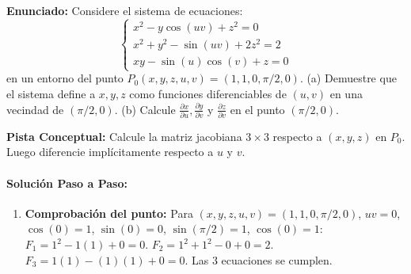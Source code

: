 \documentclass[11pt,a4paper]{article}
\begin{document}
\begin{tcolorbox}[colback=white,colframe=gray!40,arc=1mm,boxrule=0.5pt,left=3mm,right=3mm,top=2mm,bottom=2mm]
\textbf{Enunciado:} Considere el sistema de ecuaciones:
\begin{equation*}
\begin{cases} x^2 - y\cos(uv) + z^2 = 0 \\ x^2 + y^2 - \sin(uv) + 2z^2 = 2 \\ xy - \sin(u)\cos(v) + z = 0 \end{cases}
\end{equation*}
en un entorno del punto $P_0(x,y,z,u,v) = (1, 1, 0, \pi/2, 0)$.
(a) Demuestre que el sistema define a $x,y,z$ como funciones diferenciables de $(u,v)$ en una vecindad de $(\pi/2, 0)$.
(b) Calcule $\frac{\partial x}{\partial u}, \frac{\partial y}{\partial v}$ y $\frac{\partial z}{\partial v}$ en el punto $(\pi/2, 0)$.
\end{tcolorbox}

\begin{tcolorbox}[colback=yellow!4,colframe=accentamber!70,arc=1mm,boxrule=0.5pt,left=3mm,right=3mm,top=1.5mm,bottom=1.5mm]
\textbf{Pista Conceptual:} Calcule la matriz jacobiana $3\times 3$ respecto a $(x,y,z)$ en $P_0$. Luego diferencie implícitamente respecto a $u$ y $v$.
\end{tcolorbox}

\paragraph{Solución Paso a Paso:}\par
\begin{enumerate}[label=\textbf{\arabic*.}]
\item \textbf{Comprobación del punto:}
Para $(x,y,z,u,v) = (1, 1, 0, \pi/2, 0)$, $uv = 0$, $\cos(0)=1$, $\sin(0)=0$, $\sin(\pi/2)=1$, $\cos(0)=1$:
$F_1 = 1^2 - 1(1) + 0 = 0$.
$F_2 = 1^2 + 1^2 - 0 + 0 = 2$.
$F_3 = 1(1) - (1)(1) + 0 = 0$. Las 3 ecuaciones se cumplen.
\end{enumerate}
\end{document}
